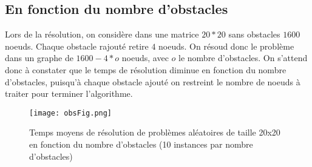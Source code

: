 \documentclass{article}
\begin{document}
\subsection{En fonction du nombre d'obstacles}
Lors de la résolution, on considère dans une matrice $20*20$ sans obstacles $1600$ noeuds. Chaque obstacle rajouté retire $4$ noeuds. On résoud donc le problème dans un graphe de $1600 - 4*o$ noeuds, avec $o$ le nombre d'obstacles. On s'attend donc à constater que le temps de résolution diminue en fonction du nombre d'obstacles, puisqu'à chaque obstacle ajouté on restreint le nombre de noeuds à traiter pour terminer l'algorithme.
\begin{figure}[!ht]
\centering
\texttt{[image: obsFig.png]}
\caption{Temps moyens de résolution de problèmes aléatoires de taille 20x20 en fonction du nombre d'obstacles (10 instances par nombre d'obstacles)}
\end{figure}
\end{document}
